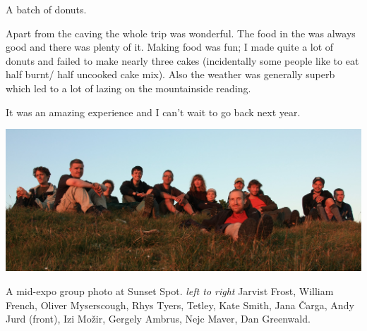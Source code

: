 \begin{marginfigure}
\checkoddpage \ifoddpage \forcerectofloat \else \forceversofloat \fi
\centering
 \caption{A batch of donuts. }
 \label{donuts}
\end{marginfigure}


Apart from the caving the whole trip was wonderful. The food in the  was always good and there was plenty of it. Making food was fun; I made quite a lot of donuts and failed to make nearly three cakes (incidentally some people like to eat half burnt/ half uncooked cake mix). Also the weather was generally superb which led to a lot of lazing on the mountainside reading.

It was an amazing experience and I can’t wait to go back next year.

\begin{pagefigure}
\checkoddpage \ifoddpage \forcerectofloat \else \forceversofloat \fi
   \centering
\includegraphics[width = \textwidth]{2012/alex_pitcher/rhys/2012-08-01-1123-GergelyAmbrus-IMG_2146--orig.jpg}
\caption{A mid-expo group photo at Sunset Spot. \textit{left to right} Jarvist Frost, William French, Oliver Myserscough, Rhys Tyers, Tetley, Kate Smith, Jana Čarga, Andy Jurd (front), Izi Možir, Gergely Ambrus, Nejc Maver, Dan Greenwald. } \label{group sunset 2012}
\end{pagefigure}
